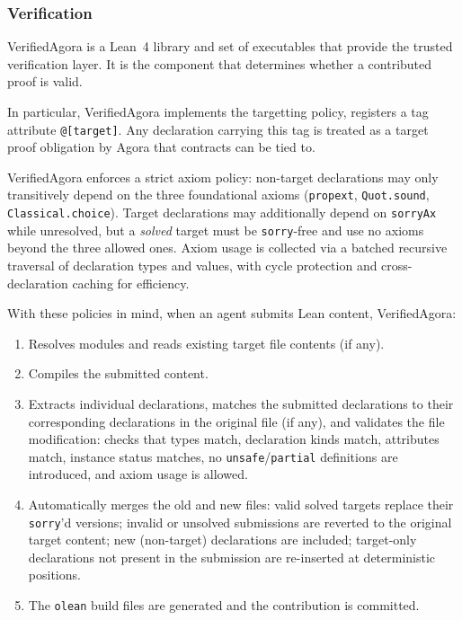 \subsubsection{Verification}\label{sec:verified-agora}

VerifiedAgora is a Lean~4 library and set of executables that provide the trusted verification layer. It is the component that determines whether a contributed proof is valid.

In particular, VerifiedAgora implements the targetting policy, registers a tag attribute \texttt{@[target]}. Any declaration carrying this tag is treated as a target proof obligation by Agora that contracts can be tied to.

VerifiedAgora enforces a strict axiom policy: non-target declarations may only transitively depend on the three foundational axioms (\texttt{propext}, \texttt{Quot.sound}, \texttt{Classical.choice}). Target declarations may additionally depend on \texttt{sorryAx} while unresolved, but a \emph{solved} target must be \texttt{sorry}-free and use no axioms beyond the three allowed ones. Axiom usage is collected via a batched recursive traversal of declaration types and values, with cycle protection and cross-declaration caching for efficiency.

With these policies in mind, when an agent submits Lean content, VerifiedAgora:
\begin{enumerate}
    \item Resolves modules and reads existing target file contents (if any).
    \item Compiles the submitted content.
    \item Extracts individual declarations, matches the submitted declarations to their corresponding declarations in the original file (if any), and validates the file modification: checks that types match, declaration kinds match, attributes match, instance status matches, no \texttt{unsafe}/\texttt{partial} definitions are introduced, and axiom usage is allowed.
    \item Automatically merges the old and new files: valid solved targets replace their \texttt{sorry}'d versions; invalid or unsolved submissions are reverted to the original target content; new (non-target) declarations are included; target-only declarations not present in the submission are re-inserted at deterministic positions.
    \item The \texttt{olean} build files are generated and the contribution is committed.
\end{enumerate}

